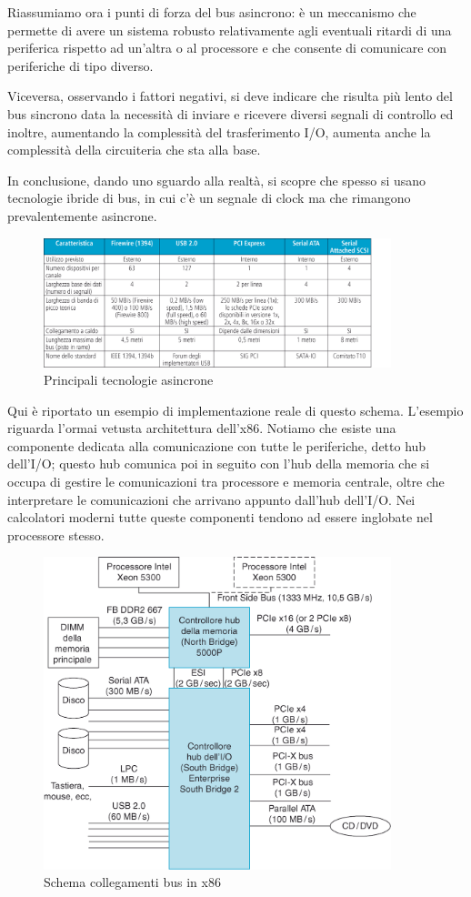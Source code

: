 \documentclass[class=book, crop=false, oneside]{standalone}
\begin{document}
Riassumiamo ora i punti di forza del bus asincrono: è un meccanismo che permette di avere un sistema robusto relativamente agli eventuali ritardi di una periferica rispetto ad un'altra o al processore e che consente di comunicare con periferiche di tipo diverso.

Viceversa, osservando i fattori negativi, si deve indicare che risulta più lento del bus sincrono data la necessità di inviare e ricevere diversi segnali di controllo ed inoltre, aumentando la complessità del trasferimento I/O, aumenta anche la complessità della circuiteria che sta alla base.

In conclusione, dando uno sguardo alla realtà, si scopre che spesso si usano tecnologie ibride di bus, in cui c'è un segnale di clock ma che rimangono prevalentemente asincrone.

\begin{figure}[H]
	\centering
	\includegraphics[width=0.9\textwidth,keepaspectratio]{tecnologie-asincrone}
	\caption{Principali tecnologie asincrone}
\end{figure}
Qui è riportato un esempio di implementazione reale di questo schema. L'esempio riguarda l'ormai vetusta architettura dell'x86. Notiamo che esiste una componente dedicata alla comunicazione con tutte le periferiche, detto hub dell'I/O; questo hub comunica poi in seguito con l'hub della memoria che si occupa di gestire le comunicazioni tra processore e memoria centrale, oltre che interpretare le comunicazioni che arrivano appunto dall'hub dell'I/O.
Nei calcolatori moderni tutte queste componenti tendono ad essere inglobate nel processore stesso.
\begin{figure}[H]
	\centering
	\includegraphics[width=0.9\textwidth,keepaspectratio]{esempio-x86}
	\caption{Schema collegamenti bus in x86}
\end{figure}
\end{document}
